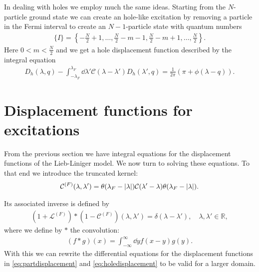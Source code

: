 \documentclass[11pt, a4paper]{report} %
\begin{document}
In dealing with holes we employ much the same ideas.
Starting from the \(N\)-particle ground state we can create an hole-like excitation by removing a particle in the Fermi interval to create an \(N-1\)-particle state with quantum numbers
\begin{align}
  \label{eq:26}
  \{I\} = \left\{-\frac{N}{2}+1,\ldots,\frac{N}{2}-m-1,\frac{N}{2}-m+1,\ldots,\frac{N}{2}\right\}.
\end{align}
Here \(0<m<\frac{N}{2}\) and we get a hole displacement function described by the integral equation~\cite{Caux2015}
\begin{align}
  \label{eq:holedisplacement}
  D_h(\lambda,q) - \int_{-\lambda_F}^{\lambda_F} \dd \lambda' \mathcal{C}(\lambda-\lambda') D_h(\lambda',q) = \frac{1}{2\pi}(\pi+\phi(\lambda-q)).
\end{align}






\section{Displacement functions for excitations}

From the previous section we have integral equations for the displacement functions of the Lieb-Liniger model.
We now turn to solving these equations.
To that end we introduce the truncated kernel:
\begin{align}
  \label{eq:inversetruncated}
  \mathcal{C}^{(F)}(\lambda,\lambda') = \theta(\lambda_F-\abs{\lambda}) \mathcal{C}(\lambda'-\lambda) \theta(\lambda_F-\abs{\lambda}).
\end{align}

Its associated inverse is defined by
\begin{align}
  \label{eq:32}
  	\left(1 + \mathcal{L}^{(F)}\right) * \left(1 - \mathcal{C}^{(F)}\right)(\lambda,\lambda')=\delta(\lambda-\lambda'), \quad \lambda, \lambda' \in \mathbb{R},
\end{align}
where we define by \(*\) the convolution:
\begin{align}
  \label{eq:29}
  (f*g)(x) = \int_{-\infty}^{\infty} \dd y f(x-y)g(y).
\end{align}
With this we can rewrite the differential equations for the displacement functions in \cref{eq:partdisplacement} and \cref{eq:holedisplacement} to be valid for a larger domain.
\end{document}
